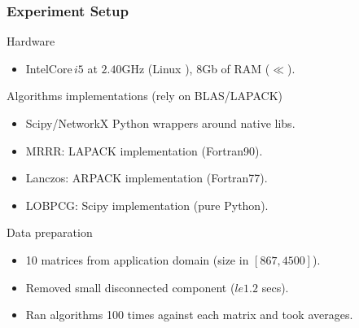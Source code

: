  \begin{frame}
  \frametitle{Experiment Setup}
  \begin{block}{Hardware}
    \begin{itemize}
    \item Intel\textregistered Core\texttrademark $\,i5$ at $2.40$GHz
      (Linux ), $8$Gb of RAM ($\ll$).
    \end{itemize}
  \end{block}
  \begin{block}{Algorithms implementations (rely on BLAS/LAPACK)}
    \begin{itemize}
    \item Scipy/NetworkX Python wrappers around native libs.
    \item MRRR: LAPACK implementation (Fortran90).
    \item Lanczos: ARPACK implementation (Fortran77).
    \item LOBPCG: Scipy implementation (pure Python).
    \end{itemize}
  \end{block}
  \begin{block}{Data preparation}
    \begin{itemize}
    \item 10 matrices from application domain (size in $[867,4500]$).
    \item Removed small disconnected component ($le 1.2$ secs).
    \item Ran algorithms 100 times against each matrix and took averages.
    \end{itemize}
  \end{block}    
\end{frame}
